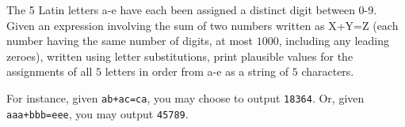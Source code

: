 

The 5 Latin letters a-e have each been assigned a distinct digit between 0-9.
Given an expression involving the sum of two numbers written as X+Y=Z
(each number having the same number of digits, at most $1000$, including any
leading zeroes), written using letter substitutions, print plausible values for
the assignments of all $5$ letters in order from a-e as a string of $5$ characters.

For instance, given \texttt{ab+ac=ca}, you may choose to output
\texttt{18364}. Or, given \texttt{aaa+bbb=eee}, you may output \texttt{45789}.

